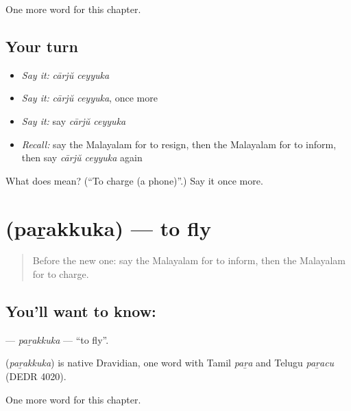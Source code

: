 \begin{grammarlens}[title={What you've built}]
One more word for this chapter.
\end{grammarlens}

\subsection*{Your turn}
\begin{itemize}
\raggedright
  \item \emph{Say it:} \emph{cārjŭ ceyyuka}
  \item \emph{Say it:} \emph{cārjŭ ceyyuka}, once more
  \item \emph{Say it:} say \emph{cārjŭ ceyyuka}
  \item \emph{Recall:} say the Malayalam for to resign, then the Malayalam for to inform, then say \emph{cārjŭ ceyyuka} again
\end{itemize}

\begin{tcolorbox}[breakable,colback=teal!4,colframe=teal!35!black,title={Before you move on}]
What does   mean? (\textquotedblleft{}To charge (a phone)\textquotedblright{}.) Say it once more.
\end{tcolorbox}
\section[\texorpdfstring{\ml{പറക്കുക} (paṟakkuka)}{പറക്കുക (paṟakkuka)}]{ (paṟakkuka) — to fly}

\label{lesson:ML-C185-parakkuka}



\begin{quote}
Before the new one: say the Malayalam for to inform, then the Malayalam for to charge.
\end{quote}

\subsection*{You'll want to know: }
\textbf{} — \emph{paṟakkuka} — \textquotedblleft{}to fly\textquotedblright{}.

\begin{cousinweb}
\textbf{} (\emph{paṟakkuka}) is native Dravidian, one word with Tamil \emph{paṟa} and Telugu \emph{paṟacu} (DEDR 4020).
\end{cousinweb}

\begin{grammarlens}[title={What you've built}]
One more word for this chapter.
\end{grammarlens}

